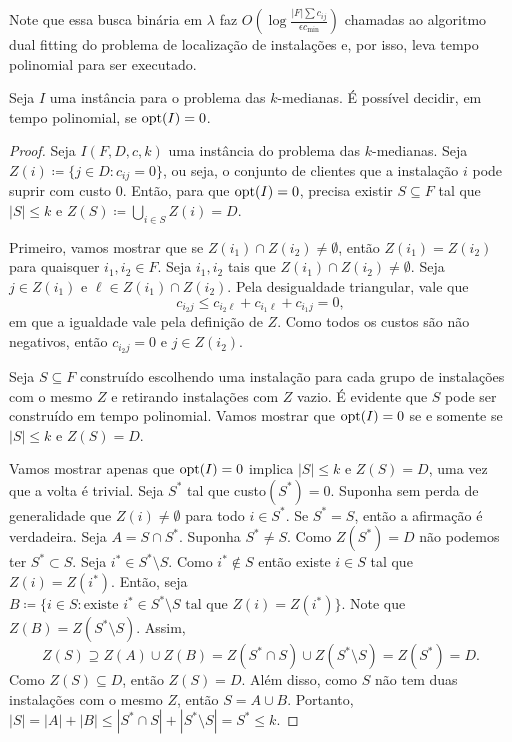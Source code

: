 Note que essa busca binária em $\lambda$ faz $O(\log \frac{|F| \sum c_{ij}}{\epsilon c_{\min}})$ chamadas ao algoritmo dual fitting do problema de localização de instalações e, por isso, leva tempo polinomial para ser executado.

\begin{lemma}
    Seja $I$ uma instância para o problema das $k$-medianas. É possível decidir, em tempo polinomial, se $\mathrm{opt}(I) = 0$.
\end{lemma}
\begin{proof}
    Seja $I(F,D,c,k)$ uma instância do problema das $k$-medianas. Seja $Z(i) \coloneqq \{j \in D: c_{ij} = 0\}$, ou seja, o conjunto de clientes que a instalação $i$ pode suprir com custo 0. Então, para que $\mathrm{opt}(I) = 0$, precisa existir $S \subseteq F$ tal que $|S|\leq k$ e $Z(S) \coloneqq \bigcup_{i \in S} Z(i) = D$.

    Primeiro, vamos mostrar que se $Z(i_1) \cap Z(i_2) \neq \emptyset$, então $Z(i_1) = Z(i_2)$ para quaisquer $i_1,i_2 \in F$. Seja $i_1,i_2$ tais que $Z(i_1) \cap Z(i_2) \neq \emptyset$. Seja $j \in Z(i_1)$ e $\ell \in Z(i_1) \cap Z(i_2)$. Pela desigualdade triangular, vale que
    \[c_{i_2j} \leq c_{i_2\ell} + c_{i_1\ell} + c_{i_1j} = 0,\]
    em que a igualdade vale pela definição de $Z$. Como todos os custos são não negativos, então $c_{i_2j} = 0$ e $j \in Z(i_2)$.

    Seja $S \subseteq F$ construído escolhendo uma instalação para cada grupo de instalações com o mesmo $Z$ e retirando instalações com $Z$ vazio. É evidente que $S$ pode ser construído em tempo polinomial. Vamos mostrar que $\mathrm{opt}(I) = 0$ se e somente se $|S| \leq k$ e $Z(S) = D$.

    Vamos mostrar apenas que $\mathrm{opt}(I) = 0$ implica $|S|\leq k$ e $Z(S) = D$, uma vez que a volta é trivial. Seja $S^*$ tal que custo$(S^*) = 0$. Suponha sem perda de generalidade que $Z(i) \neq \emptyset$ para todo $i \in S^*$. Se $S^* = S$, então a afirmação é verdadeira. Seja $A = S \cap S^*$. Suponha $S^* \neq S$. Como $Z(S^*)=D$ não podemos ter $S^* \subset S$. Seja $i^* \in S^* \setminus S$. Como $i^* \not \in S$ então existe $i \in S$ tal que $Z(i) = Z(i^*)$. Então, seja $B \coloneqq \{i \in S: \text{existe } i^* \in S^* \setminus S \text{ tal que } Z(i) = Z(i^*)\}$. Note que $Z(B) = Z(S^*\setminus S)$. Assim,
    \[Z(S) \supseteq Z(A) \cup Z(B) = Z(S^* \cap S) \cup Z(S^*\setminus S) = Z(S^*) = D.\]
    Como $Z(S) \subseteq D$, então $Z(S) = D$. Além disso, como $S$ não tem duas instalações com o mesmo $Z$, então $S = A \cup B$. Portanto, $|S| = |A| + |B| \leq |S^* \cap S| + |S^* \setminus S| = S^* \leq k$.
\end{proof}

